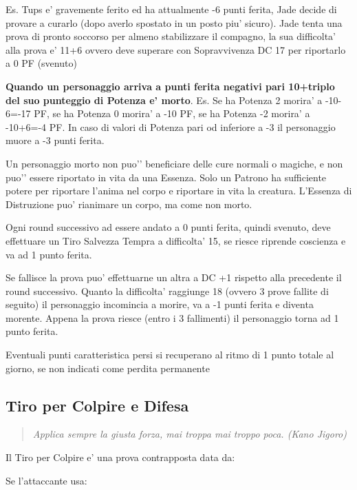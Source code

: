 \documentclass[a4paper,11pt,twoside,openany]{book}
\begin{document}
Es. Tups e’ gravemente ferito ed ha attualmente -6 punti ferita, Jade decide di provare a curarlo (dopo averlo spostato in un posto piu’ sicuro). Jade tenta una prova di pronto soccorso per almeno stabilizzare il compagno, la sua difficolta’ alla prova e’ 11+6 ovvero deve superare con Sopravvivenza DC 17 per riportarlo a 0 PF (svenuto)

\textbf{Quando un personaggio arriva a punti ferita negativi pari 10+triplo del suo punteggio di Potenza e’ morto}. Es. Se ha Potenza 2 morira’ a -10-6=-17 PF, se ha Potenza 0 morira’ a -10 PF, se ha Potenza -2 morira’ a -10+6=-4 PF. In caso di valori di Potenza pari od inferiore a -3 il personaggio muore a -3 punti ferita.

\bigskip

Un personaggio morto non puo'’ beneficiare delle cure normali o magiche, e non puo'’ essere riportato in vita da una Essenza. Solo un Patrono ha sufficiente potere per riportare l’anima nel corpo e riportare in vita la creatura. L’Essenza di Distruzione puo' rianimare un corpo, ma come non morto.

Ogni round successivo ad essere andato a 0 punti ferita, quindi svenuto, deve effettuare un Tiro Salvezza Tempra a difficolta’ 15, se riesce riprende coscienza e va ad 1 punto ferita.

Se fallisce la prova puo’ effettuarne un altra a DC +1 rispetto alla precedente il round successivo. Quanto la difficolta’ raggiunge 18 (ovvero 3 prove fallite di seguito) il personaggio incomincia a morire, va a -1 punti ferita e diventa morente.
Appena la prova riesce (entro i 3 fallimenti) il personaggio torna ad 1 punto ferita.

Eventuali punti caratteristica persi si recuperano al ritmo di 1 punto totale al giorno, se non indicati come perdita permanente
\pagebreak

\subsection{Tiro per Colpire e Difesa}

\label{tiro-per-colpire}
\begin{quote}\textit{Applica sempre la giusta forza, mai troppa mai troppo poca. (Kano Jigoro)
}\end{quote}

Il Tiro per Colpire e' una prova contrapposta data da:

Se l'attaccante usa:
\end{document}

